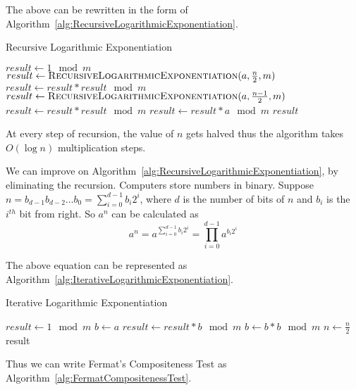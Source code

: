 \documentclass[11pt]{article}
\begin{document}
The above can be rewritten in the form of Algorithm~\ref{alg:RecursiveLogarithmicExponentiation}.

\begin{algorithm}
\caption{Recursive Logarithmic Exponentiation}
\label{alg:RecursiveLogarithmicExponentiation}
\begin{algorithmic}
\State $result \gets 1 \mod m$ 
	\State $result \gets \Call{RecursiveLogarithmicExponentiation}{a, \frac n 2, m}$
	\State $result \gets result * result \mod m$ 
	\State $result \gets \Call{RecursiveLogarithmicExponentiation}{a, \frac {n-1} 2, m}$
	\State $result \gets result * result \mod m$
	\State $result \gets result * a \mod m$
\EndIf
\State \Return $result$
\EndProcedure
\end{algorithmic}
\end{algorithm}

At every step of recursion, the value of $n$ gets halved thus the algorithm takes $O(\log n)$ multiplication steps.

We can improve on Algorithm~\ref{alg:RecursiveLogarithmicExponentiation}, by eliminating the recursion. Computers store numbers in binary. Suppose $n = b_{d-1}b_{d-2}\dots b_{0} = \sum_{i=0}^{d-1}b_i 2^i$, where $d$ is the number of bits of $n$ and $b_i$ is the $i^{th}$ bit from right. So $a^n$ can be calculated as
\[a^n = a^{\sum_{i=0}^{d-1}b_i 2^i} = \prod_{i=0}^{d-1} a^{b_i 2^i}\]

The above equation can be represented as Algorithm~\ref{alg:IterativeLogarithmicExponentiation}.

\begin{algorithm}
\caption{Iterative Logarithmic Exponentiation}
\label{alg:IterativeLogarithmicExponentiation}
\begin{algorithmic}
\State $result \gets 1 \mod m$ 
\State $b \gets a$
 
	\State $result \gets result * b \mod m$ 
\EndIf
\State $b \gets b * b \mod m$ 
\State $n \gets \frac n 2$ 
\EndWhile \label{euclidendwhile}
\State \Return result
\EndProcedure
\end{algorithmic}
\end{algorithm}
Thus we can write Fermat's Compositeness Test as Algorithm~\ref{alg:FermatCompositenessTest}.
\end{document}
